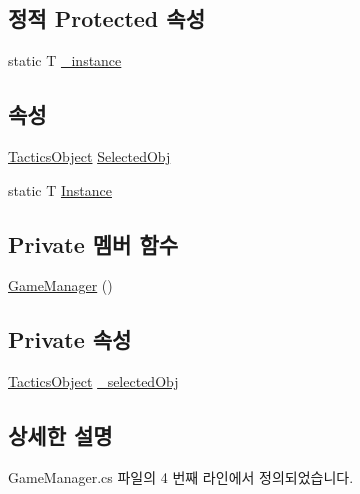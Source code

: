 \subsection*{정적 Protected 속성}
\begin{DoxyCompactItemize}
\item 
static T \hyperlink{class_m_c_n_1_1_singletone_a267e8a9e6e7c073b988cda4f95e26eb1}{\+\_\+instance}
\end{DoxyCompactItemize}
\subsection*{속성}
\begin{DoxyCompactItemize}
\item 
\hyperlink{class_tactics_object}{Tactics\+Object} \hyperlink{class_game_manager_a708d9fb61ea9f34e4c3a55d34c31acf2}{Selected\+Obj}
\item 
static T \hyperlink{class_m_c_n_1_1_singletone_a46dbbebd93e96a9592a9803c51f35602}{Instance}
\end{DoxyCompactItemize}
\subsection*{Private 멤버 함수}
\begin{DoxyCompactItemize}
\item 
\hyperlink{class_game_manager_aba36fa5d78b798e6707bd23c5ee55f19}{Game\+Manager} ()
\end{DoxyCompactItemize}
\subsection*{Private 속성}
\begin{DoxyCompactItemize}
\item 
\hyperlink{class_tactics_object}{Tactics\+Object} \hyperlink{class_game_manager_a5a9b1c2a22af163ddb89c8a55d2f1603}{\+\_\+selected\+Obj}
\end{DoxyCompactItemize}


\subsection{상세한 설명}


Game\+Manager.\+cs 파일의 4 번째 라인에서 정의되었습니다.



